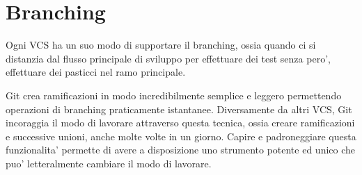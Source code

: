 \section{Branching}
Ogni VCS ha un suo modo di supportare il branching, ossia quando ci si distanzia dal flusso principale di sviluppo per effettuare dei test senza pero', effettuare dei pasticci nel ramo principale.

Git crea ramificazioni in modo incredibilmente semplice e leggero permettendo operazioni di branching praticamente istantanee. Diversamente da altri VCS, Git incoraggia il modo di lavorare attraverso questa tecnica, ossia creare ramificazioni e successive unioni, anche molte volte in un giorno. Capire e padroneggiare questa funzionalita' permette di avere a disposizione uno strumento potente ed unico che puo' letteralmente cambiare il modo di lavorare.


